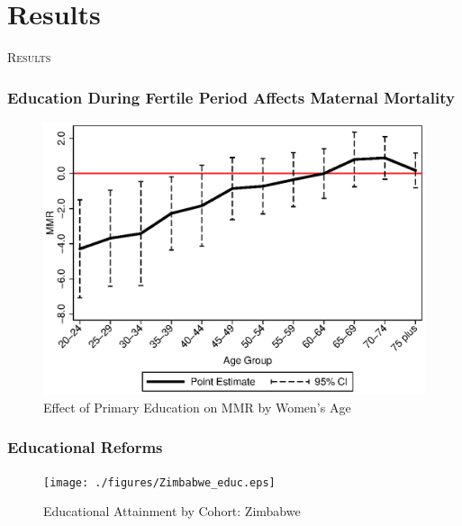 \documentclass[10pt,letterpaper,subeqn, xcolor=table]{beamer}
\begin{document}
\section{Results}
\begin{frame}
\begin{center}
\Large	
\textsc{\textcolor{dblue}{Results}}
\end{center}
\end{frame}


\begin{frame}

\end{frame}

\begin{frame}[label=GTABLE]

\end{frame}

\begin{frame}
\frametitle{Education During Fertile Period Affects Maternal Mortality}
  \begin{figure}[!htbp]
\begin{center}
\includegraphics[scale=0.65]{./figures/PrimaryAge.eps}
\caption{Effect of Primary Education on MMR by Women's Age}
\end{center}
\end{figure}
\end{frame}


\begin{frame}[label=ZIMBABWE_EDUC]
\frametitle{Educational Reforms}
  \begin{figure}[!htbp]
\begin{center}
\texttt{[image: ./figures/Zimbabwe\_educ.eps]}
\caption{Educational Attainment by Cohort: Zimbabwe}
\end{center}
\end{figure}
\hyperlink{NIGERIA_EDUC}{}
\end{frame}
\end{document}

